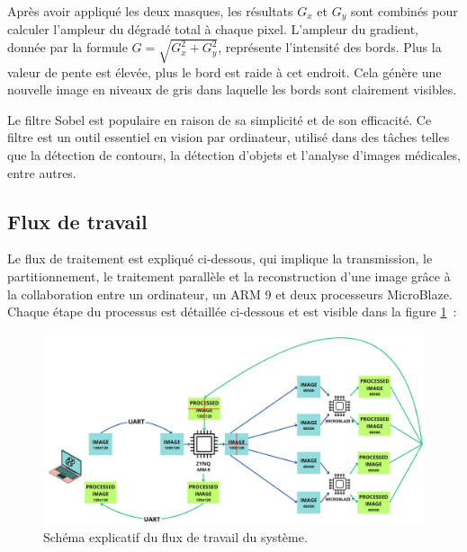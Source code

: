\documentclass[../CSC_5RO07_TA.tex]{subfiles}
\begin{document}
\vspace{1em} 

Après avoir appliqué les deux masques, les résultats $G_x$ et $G_y$ sont combinés pour calculer l'ampleur du dégradé total à chaque pixel. L'ampleur du gradient, donnée par la formule $G = \sqrt{G_x^2 + G_y^2}$, représente l'intensité des bords. Plus la valeur de pente est élevée, plus le bord est raide à cet endroit. Cela génère une nouvelle image en niveaux de gris dans laquelle les bords sont clairement visibles. 

\vspace{1em} 

Le filtre Sobel est populaire en raison de sa simplicité et de son efficacité. Ce filtre est un outil essentiel en vision par ordinateur, utilisé dans des tâches telles que la détection de contours, la détection d'objets et l'analyse d'images médicales, entre autres.

\subsection{Flux de travail}

Le flux de traitement est expliqué ci-dessous, qui implique la transmission, le partitionnement, le traitement parallèle et la reconstruction d'une image grâce à la collaboration entre un ordinateur, un ARM 9 et deux processeurs MicroBlaze. Chaque étape du processus est détaillée ci-dessous et est visible dans la figure \ref{fig:2} :

\begin{figure}[H]
    \centering
    \includegraphics[width=0.8\columnwidth]{./images/DiagramaBloques3x3.jpg}
    \caption{Schéma explicatif du flux de travail du système.}
    \label{fig:2}
\end{figure}
\end{document}

